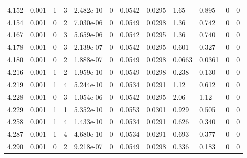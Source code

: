 \documentclass[preview]{standalone}
\begin{document}
{{{{{{{\begin{tabular}{L{1.2cm}C{1.2cm} C{0.3cm}C{0.5cm} C{1.4cm}C{1.4cm} C{1.4cm}C{1.4cm} C{1.6cm}C{1.6cm} C{1.6cm}C{1.6cm}}
  4.152  &  0.001  & 1     &  3 &  2.482e-10  & 0  &  0.0542&   0.0295& 1.65 & 0.895   &  0 & 0  \\ 
  4.154  &  0.001  & 0     &  2 &  7.030e-06  & 0  &  0.0549&   0.0298& 1.36 & 0.742   &  0 & 0  \\ 
  4.167  &  0.001  & 0     &  3 &  5.659e-06  & 0  &  0.0542&   0.0295& 1.36 & 0.740   &  0 & 0  \\ 
  4.178  &  0.001  & 0     &  3 &  2.139e-07  & 0  &  0.0542&   0.0295& 0.601 & 0.327   &  0 & 0  \\ 
  4.180  &  0.001  & 0     &  2 &  1.888e-07  & 0  &  0.0549&   0.0298& 0.0663 & 0.0361   &  0 & 0  \\ 
  4.216  &  0.001  & 1     &  2 &  1.959e-10  & 0  &  0.0549&   0.0298& 0.238 & 0.130   &  0 & 0  \\ 
  4.219  &  0.001  & 1     &  4 &  5.244e-10  & 0  &  0.0534&   0.0291& 1.12 & 0.612   &  0 & 0  \\ 
  4.228  &  0.001  & 0     &  3 &  1.054e-06  & 0  &  0.0542&   0.0295& 2.06 & 1.12   &  0 & 0  \\ 
  4.229  &  0.001  & 1     &  1 &  5.352e-10  & 0  &  0.0553&   0.0301& 0.929 & 0.505   &  0 & 0  \\ 
  4.258  &  0.001  & 1     &  4 &  1.433e-10  & 0  &  0.0534&   0.0291& 0.626 & 0.340   &  0 & 0  \\ 
  4.287  &  0.001  & 1     &  4 &  4.680e-10  & 0  &  0.0534&   0.0291& 0.693 & 0.377   &  0 & 0  \\ 
  4.290  &  0.001  & 0     &  2 &  9.218e-07  & 0  &  0.0549&   0.0298& 0.336 & 0.183   &  0 & 0  \\ 
\hline 
\end{tabular} 

}}}}}}}
\end{document}
